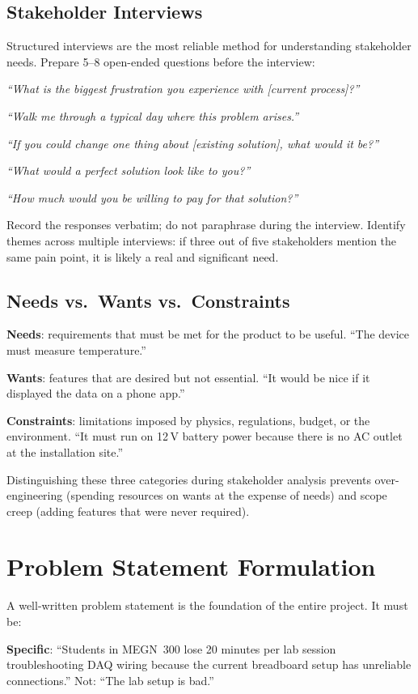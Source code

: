 \subsection{Stakeholder Interviews}
Structured interviews are the most reliable method for understanding stakeholder needs. Prepare 5--8 open-ended questions before the interview:

\emph{``What is the biggest frustration you experience with [current process]?''}

\emph{``Walk me through a typical day where this problem arises.''}

\emph{``If you could change one thing about [existing solution], what would it be?''}

\emph{``What would a perfect solution look like to you?''}

\emph{``How much would you be willing to pay for that solution?''}

Record the responses verbatim; do not paraphrase during the interview. Identify themes across multiple interviews: if three out of five stakeholders mention the same pain point, it is likely a real and significant need.

\subsection{Needs vs.\ Wants vs.\ Constraints}
\textbf{Needs}: requirements that must be met for the product to be useful. ``The device must measure temperature.''

\textbf{Wants}: features that are desired but not essential. ``It would be nice if it displayed the data on a phone app.''

\textbf{Constraints}: limitations imposed by physics, regulations, budget, or the environment. ``It must run on 12\,V battery power because there is no AC outlet at the installation site.''

Distinguishing these three categories during stakeholder analysis prevents over-engineering (spending resources on wants at the expense of needs) and scope creep (adding features that were never required).

\section{Problem Statement Formulation}
A well-written problem statement is the foundation of the entire project. It must be:

\textbf{Specific}: ``Students in MEGN~300 lose 20 minutes per lab session troubleshooting DAQ wiring because the current breadboard setup has unreliable connections.'' Not: ``The lab setup is bad.''

